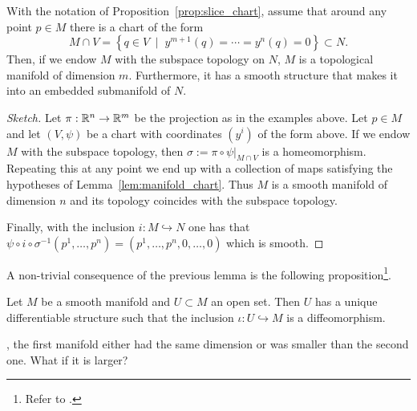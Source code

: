 \begin{lemma}
  With the notation of Proposition~\ref{prop:slice_chart}, assume that around any point $p\in M$ there is a chart of the form
  \begin{equation}
    M\cap V = \left\{ q \in V \;\mid\; y^{m+1}(q)=\cdots=y^n(q)=0\right\} \subset N.
  \end{equation}
  Then, if we endow $M$ with the subspace topology on $N$, $M$ is a topological manifold of dimension $m$.
  Furthermore, it has a smooth structure that makes it into an embedded submanifold of $N$.
\end{lemma}
\begin{proof}[Sketch]
  Let $\pi: \mathbb{R}^n\to\mathbb{R}^m$ be the projection as in the examples above.
  Let $p\in M$ and let $(V,\psi)$ be a chart with coordinates $(y^i)$ of the form above.
  If we endow $M$ with the subspace topology, then $\sigma:= \pi \circ \psi\big|_{M\cap V}$ is a homeomorphism.
  Repeating this at any point we end up with a collection of maps satisfying the hypotheses of Lemma~\ref{lem:manifold_chart}.
  Thus $M$ is a smooth manifold of dimension $n$ and its topology coincides with the subspace topology.

  Finally, with the inclusion $i:M\hookrightarrow N$ one has that $\psi \circ i\circ \sigma^{-1} (p^1,\ldots,p^n) = (p^1,\ldots,p^n,0,\ldots,0)$ which is smooth.
\end{proof}

A non-trivial consequence of the previous lemma is the following proposition\footnote{Refer to \cite[Proposition 5.8 and Proposition 5.31]{book:lee}.}.

\begin{proposition}\label{prop:uniqdiffeoinclusion}
  Let $M$ be a smooth manifold and $U\subset M$ an open set.
  Then $U$ has a unique differentiable structure such that the inclusion $\iota:U\hookrightarrow M$ is a diffeomorphism.
\end{proposition}

, the first manifold either had the same dimension or was smaller than the second one.
What if it is larger?


